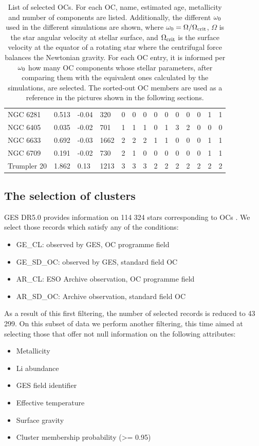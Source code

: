 \documentclass[fleqn,usenatbib]{mnras}
\begin{document}
\begin{table}
\begin{tabular}{|l l l l || c c c c c c c c c c|}
            NGC 6281 & 0.513 & -0.04 & 320 & 0 & 0 & 0 & 0 & 0 & 0 & 0 & 0 & 1 & 1\\
            NGC 6405 & 0.035 & -0.02 & 701 & 1 & 1 & 1 & 0 & 1 & 3 & 2 & 0 & 0 & 0\\
            NGC 6633 & 0.692 & -0.03 & 1662 & 2 & 2 & 2 & 1 & 1 & 0 & 0 & 0 & 1 & 1\\
            NGC 6709 & 0.191 & -0.02 & 730 & 2 & 1 & 0 & 0 & 0 & 0 & 0 & 0 & 1 & 1\\
            Trumpler 20 & 1.862 & 0.13 & 1213 & 3 & 3 & 3 & 2 & 2 & 2 & 2 & 2 & 2 & 2\\
            \hline
	\end{tabular}
 	\caption{List of selected OCs. For each OC, name, estimated age, metallicity and number of components are listed. Additionally, the different $\omega_{\mathrm{0}}$ used in the different simulations are shown, where $\omega_{\mathrm{0}} = \Omega / \Omega_{\mathrm{crit}}$, $\Omega$ is the star angular velocity at stellar surface, and $\Omega_{\mathrm{crit}}$ is the surface velocity at the equator of a rotating star where the centrifugal force balances the Newtonian gravity. For each OC entry, it is informed per $\omega_{\mathrm{0}}$ how many OC components whose stellar parameters, after comparing them with the equivalent ones calculated by the simulations, are selected. The sorted-out OC members are used as a reference in the pictures shown in the following sections.}
  	\label{tab:oc_reduced_list}
\end{table}

\subsection{The selection of clusters}
GES DR5.0 provides information on 114 324 stars corresponding to OCs \cite[see][for details]{Gilmore2022}. We select those records which satisfy any of the conditions:
\begin{itemize}
    \item GE\_CL: observed by GES, OC programme field
    \item GE\_SD\_OC: observed by GES, standard field OC
    \item AR\_CL: ESO Archive observation, OC programme field
    \item AR\_SD\_OC: Archive observation, standard field OC
\end{itemize}

As a result of this first filtering, the number of selected records is reduced to 43 299. On this subset of data we perform another filtering, this time aimed at selecting those that offer not null information on the following attributes:
\begin{itemize}
    \item Metallicity
    \item Li abundance
    \item GES field identifier
    \item Effective temperature
    \item Surface gravity
    \item Cluster membership probability (>= 0.95)
\end{itemize}
\end{document}
